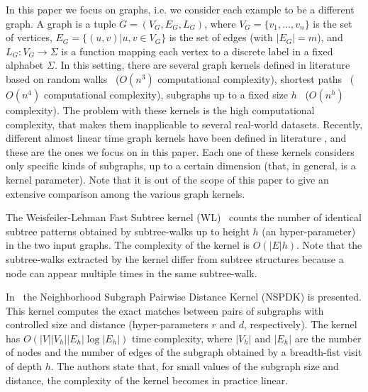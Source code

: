 \documentclass{esannV2}
\newcommand{\1}{{\bf 1}}
\begin{document}
In this paper we focus on graphs, i.e. we consider each example to be a different graph.
A graph is a tuple $G=(V_G,E_G,L_G)$, where $V_G=\{v_1,\ldots,v_n\}$ is the set of vertices, $E_G=\{(u,v) | u,v \in V_G\}$ is the set of edges (with $|E_G|=m$), and $L_G: V_G \rightarrow \Sigma$ is a function mapping each vertex to a discrete label in a fixed alphabet $\Sigma$.
In this setting, there are several graph kernels defined in literature based on random walks~\cite{Kashima03marginalizedkernels,Mahe2004} ($O(n^3)$ computational complexity), shortest paths~\cite{Kriegel05shortestpath} ($O(n^4)$ computational complexity), subgraphs up to a fixed size $h$~\cite{Shervashidze2009} ($O(n^h)$ complexity). The problem with these kernels is the high computational complexity, that makes them inapplicable to several real-world datasets.
Recently, different almost linear time graph kernels have been defined in literature \cite{Heinonen2009,Costa2010,Shervashidze2011,Dasan2012,DaSanMartino2016}, and these are the ones we focus on in this paper.
Each one of these kernels considers only specific kinds of subgraphs, up to a certain dimension (that, in general, is a kernel parameter).
Note that it is out of the scope of this paper to give an extensive comparison among the various graph kernels. 

The Weisfeiler-Lehman Fast Subtree kernel (WL)~\cite{Shervashidze2011}  counts the number of identical subtree patterns obtained by subtree-walks up to height $h$ (an hyper-parameter) in the two input graphs. The complexity of the kernel is $O(|E|h)$. 
Note that the subtree-walks extracted by the kernel differ from  subtree structures because a node can appear multiple times in the same subtree-walk.

In~\cite{Costa2010} the Neighborhood Subgraph Pairwise Distance Kernel (NSPDK) is presented. This kernel computes the exact matches between pairs of subgraphs with controlled size and distance (hyper-parameters $r$ and $d$, respectively). 
The kernel has $O(|V| |V_h| |E_h| \log |E_h|)$ time complexity, where $|V_h|$ and $|E_h|$ are the number of nodes and the number of edges of the subgraph obtained by a breadth-fist visit of depth $h$. 
The authors state that, for small values of the subgraph size and distance, the complexity of the kernel becomes in practice linear.
\end{document}
